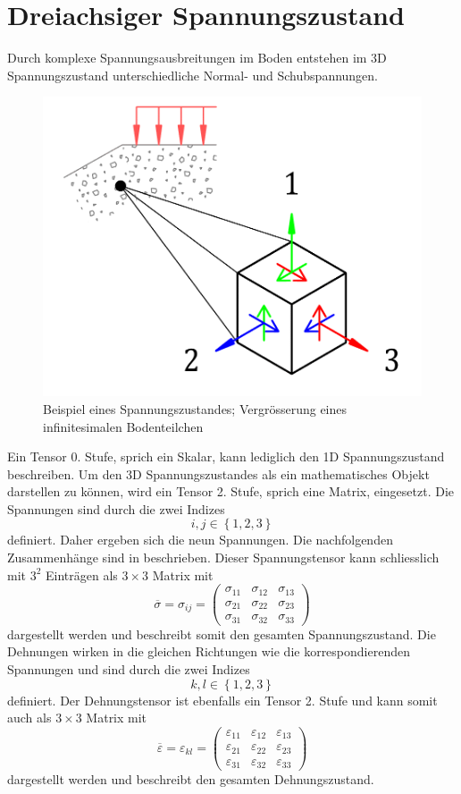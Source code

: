\section{Dreiachsiger Spannungszustand\label{spannung:section:Dreiachsiger_Spannungszustand}}
Durch komplexe Spannungsausbreitungen im Boden entstehen im 3D Spannungszustand unterschiedliche Normal- und Schubspannungen.
\begin{figure}
	\centering
	\includegraphics[width=0.30\linewidth,keepaspectratio]{papers/spannung/Grafiken/infinitesimalerWuerfel.png}
	\caption{Beispiel eines Spannungszustandes; Vergrösserung eines infinitesimalen Bodenteilchen}
	\label{fig:infinitesimalerWuerfel}
\end{figure}
Ein Tensor 0. Stufe, sprich ein Skalar, kann lediglich den 1D Spannungszustand beschreiben.
Um den 3D Spannungszustandes als ein mathematisches Objekt darstellen zu können, wird ein Tensor 2. Stufe, sprich eine Matrix, eingesetzt.
Die Spannungen sind durch die zwei Indizes
\[
i, j\in\left\{1, 2, 3\right\}
\]
definiert.
Daher ergeben sich die neun Spannungen.
Die nachfolgenden Zusammenhänge sind in \cite{spannung:Voigtsche-Notation} beschrieben.
Dieser Spannungstensor kann schliesslich mit $3^2$ Einträgen als $3\times3$ Matrix mit
\[
\overline{\sigma}
=
\sigma_{ij}
=
\begin{pmatrix}
	\sigma_{11} & \sigma_{12} & \sigma_{13} \\ 
	\sigma_{21} & \sigma_{22} & \sigma_{23} \\
	\sigma_{31} & \sigma_{32} & \sigma_{33}
\end{pmatrix}
\]
dargestellt werden und beschreibt somit den gesamten Spannungszustand.
Die Dehnungen wirken in die gleichen Richtungen wie die korrespondierenden Spannungen und sind durch die zwei Indizes
\[
k, l\in\left\{1, 2, 3\right\}
\]
definiert.
Der Dehnungstensor ist ebenfalls ein Tensor 2. Stufe und kann somit auch als $3\times3$ Matrix mit
\[
\overline{\varepsilon}
=
\varepsilon_{kl}
=
\begin{pmatrix}
	\varepsilon_{11} & \varepsilon_{12} & \varepsilon_{13} \\ 
	\varepsilon_{21} & \varepsilon_{22} & \varepsilon_{23} \\
	\varepsilon_{31} & \varepsilon_{32} & \varepsilon_{33}
\end{pmatrix}
\]
dargestellt werden und beschreibt den gesamten Dehnungszustand.

